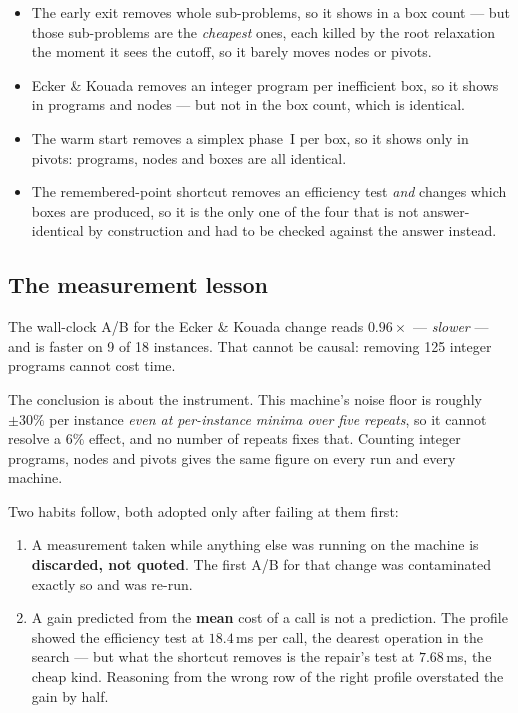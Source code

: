 \documentclass[11pt,a4paper]{article}
\begin{document}
\begin{itemize}
\item The early exit removes whole sub-problems, so it shows in a box count ---
  but those sub-problems are the \emph{cheapest} ones, each killed by the root
  relaxation the moment it sees the cutoff, so it barely moves nodes or pivots.
\item Ecker \& Kouada removes an integer program per inefficient box, so it
  shows in programs and nodes --- but not in the box count, which is identical.
\item The warm start removes a simplex phase~I per box, so it shows only in
  pivots: programs, nodes and boxes are all identical.
\item The remembered-point shortcut removes an efficiency test \emph{and}
  changes which boxes are produced, so it is the only one of the four that is
  not answer-identical by construction and had to be checked against the
  answer instead.
\end{itemize}

\subsection{The measurement lesson}

The wall-clock A/B for the Ecker \& Kouada change reads $0.96\times$ ---
\emph{slower} --- and is faster on 9 of 18 instances.  That cannot be causal:
removing 125 integer programs cannot cost time.

The conclusion is about the instrument.  This machine's noise floor is roughly
$\pm 30\%$ per instance \emph{even at per-instance minima over five repeats},
so it cannot resolve a $6\%$ effect, and no number of repeats fixes that.
Counting integer programs, nodes and pivots gives the same figure on every run
and every machine.

Two habits follow, both adopted only after failing at them first:

\begin{enumerate}
\item A measurement taken while anything else was running on the machine is
  \textbf{discarded, not quoted}.  The first A/B for that change was
  contaminated exactly so and was re-run.
\item A gain predicted from the \textbf{mean} cost of a call is not a
  prediction.  The profile showed the efficiency test at $18.4$\,ms per call,
  the dearest operation in the search --- but what the shortcut removes is the
  repair's test at $7.68$\,ms, the cheap kind.  Reasoning from the wrong row of
  the right profile overstated the gain by half.
\end{enumerate}
\end{document}
